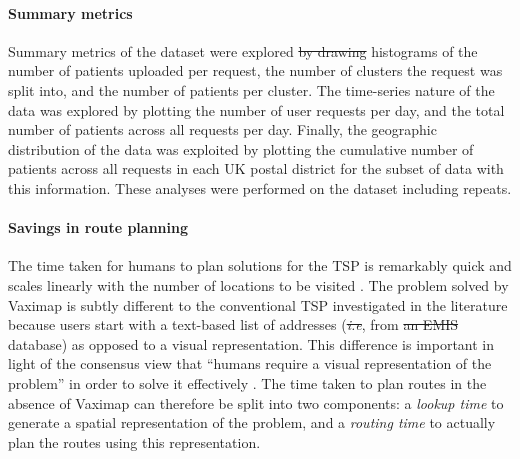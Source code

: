 \documentclass{article}
\def\vm{Vaximap}
\providecommand{\DIFadd}[1]{{\protect\color{blue}\uwave{#1}}} %
\providecommand{\DIFdel}[1]{{\protect\color{red}\sout{#1}}}                      %
\providecommand{\DIFaddbegin}{} %
\providecommand{\DIFaddend}{} %
\providecommand{\DIFdelbegin}{} %
\providecommand{\DIFdelend}{} %
\newcommand{\DIFscaledelfig}{0.5}
\newlength{\DIFdelgraphicswidth} %
\newlength{\DIFdelgraphicsheight} %
\newcommand{\DIFaddincludegraphics}[2][]{{\color{blue}\fbox{\DIFOincludegraphics[#1]{#2}}}} %
\newcommand{\DIFdelincludegraphics}[2][]{%
\sbox{\DIFdelgraphicsbox}{\DIFOincludegraphics[#1]{#2}}%
\settoboxwidth{\DIFdelgraphicswidth}{\DIFdelgraphicsbox} %
\settoboxtotalheight{\DIFdelgraphicsheight}{\DIFdelgraphicsbox} %
\scalebox{\DIFscaledelfig}{%
\parbox[b]{\DIFdelgraphicswidth}{\usebox{\DIFdelgraphicsbox}\\[-\baselineskip] \rule{\DIFdelgraphicswidth}{0em}}\llap{\resizebox{\DIFdelgraphicswidth}{\DIFdelgraphicsheight}{%
\setlength{\unitlength}{\DIFdelgraphicswidth}%
\begin{picture}(1,1)%
\thicklines\linethickness{2pt} %
{\color[rgb]{1,0,0}\put(0,0){\framebox(1,1){}}}%
{\color[rgb]{1,0,0}\put(0,0){\line( 1,1){1}}}%
{\color[rgb]{1,0,0}\put(0,1){\line(1,-1){1}}}%
\end{picture}%
}\hspace*{3pt}}} %
} %
\DeclareRobustCommand{\DIFaddbegin}{\DIFOaddbegin \let\includegraphics\DIFaddincludegraphics} %
\DeclareRobustCommand{\DIFaddend}{\DIFOaddend \let\includegraphics\DIFOincludegraphics} %
\DeclareRobustCommand{\DIFdelbegin}{\DIFOdelbegin \let\includegraphics\DIFdelincludegraphics} %
\DeclareRobustCommand{\DIFdelend}{\DIFOaddend \let\includegraphics\DIFOincludegraphics} %
\begin{document}
\paragraph{Summary metrics}
Summary metrics of the dataset were explored \DIFdelbegin \DIFdel{by drawing }\DIFdelend \DIFaddbegin \DIFadd{via }\DIFaddend histograms of the number of patients uploaded per request, the number of clusters the request was split into, and the number of patients per cluster. The time-series nature of the data was explored by plotting the number of user requests per day, and the total number of patients across all requests per day. Finally, the geographic distribution of the data was exploited by plotting the cumulative number of patients across all requests in each UK postal district for the subset of data with this information. These analyses were performed on the dataset including repeats.

\paragraph{Savings in route planning}
The time taken for humans to plan solutions for the TSP is remarkably quick and scales linearly with the number of locations to be visited \cite{Macgregor1996, Dry2006, MacGregor2011}. The problem solved by \vm{} is subtly different to the conventional TSP investigated in the literature because users start with a text-based list of addresses (\textit{\DIFdelbegin \DIFdel{i.e}\DIFdelend \DIFaddbegin \DIFadd{i.e.}\DIFaddend }, from \DIFdelbegin \DIFdel{an EMIS }\DIFdelend \DIFaddbegin \DIFadd{a patient }\DIFaddend database) as opposed to a visual representation. This difference is important in light of the consensus view that ``humans require a visual representation of the problem'' in order to solve it effectively \cite{MacGregor2011}. The time taken to plan routes in the absence of \vm{} can therefore be split into two components: a \textit{lookup time} to generate a spatial representation of the problem, and a \textit{routing time} to actually plan the routes using this representation.
\end{document}
